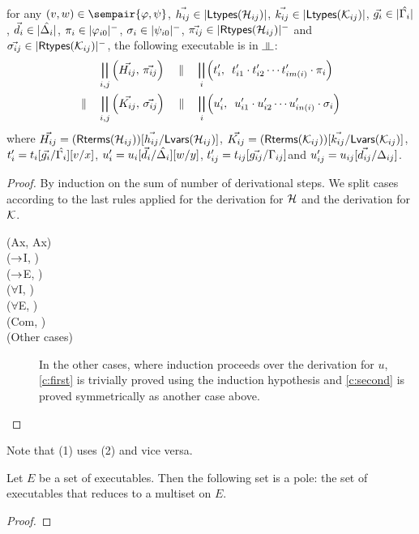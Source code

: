 \begin{proposition}[Adequacy]
\begin{enumerate}[label=(\arabic{*}), ref=\textit{(\arabic{*})}]
	for any $(v,w)\in\sempair{\phi,\psi}$,
	$\vec{h_{ij}}\in|{\mathsf{Ltypes}({\mathcal{H}_{ij}})}|$,
	$\vec{k_{ij}}\in|{\mathsf{Ltypes}({\mathcal{K}_{ij}})}|$,
	$\vec{g_i}\in|{\hat{\Gamma_i}}|$,
	$\vec{d_i}\in|{\hat{\Delta_i}}|$,
	$\pi_i\in|{\varphi_{i0}}|^-$,
	$\sigma_i\in|{\psi_{i0}}|^-$,
	$\vec{\pi_{ij}}\in|{\mathsf{Rtypes}({\mathcal{H}_{ij}})}|^-$ and
	$\vec{\sigma_{ij}}\in|{\mathsf{Rtypes}({\mathcal{K}_{ij}})}|^-$,
	the following executable is in $\bbot$:
	\begin{align*}
	       & 	 \bigparallel_{i,j}\left(\vec{H_{ij}},\,
	\vec{\pi_{ij}}\right)\quad \parallel\quad
	\bigparallel_i\left(t_i',\,\,\,t'_{i1}\cdot t'_{i2}\cdots
	t'_{im(i)}\cdot \pi_i\right)
\\
	 \parallel\quad  &
	 \bigparallel_{i,j}\left(\vec{K_{ij}},\,
	\vec{\sigma_{ij}}\right)\quad \parallel\quad
	\bigparallel_i\left(u_i',\,\,\,u'_{i1}\cdot u'_{i2}\cdots
	u'_{in(i)}\cdot \sigma_i\right)
	\end{align*}
	where
	$\vec{H_{ij}}=(\mathsf{Rterms}({\mathcal{H}_{ij}}))[\vec{h_{ij}}/\mathsf{Lvars}({\mathcal{H}_{ij}})]$,\quad
	$\vec{K_{ij}}=(\mathsf{Rterms}({\mathcal{K}_{ij}}))[\vec{k_{ij}}/\mathsf{Lvars}({\mathcal{K}_{ij}})]$,\quad
	$t'_i=t_i[\vec{g_i}/\hat{\Gamma_i}][v/x]$,\quad
	$u'_i=u_i[\vec{d_i}/\hat{\Delta_i}][w/y]$,\quad
	$t'_{ij}=t_{ij}[\vec{g_{ij}}/\Gamma_{ij}]$\quad and
	$u'_{ij}=u_{ij}[\vec{d_{ij}}/\Delta_{ij}]$\enspace.
 \end{enumerate}
\end{proposition}
\begin{proof}
 By induction on the sum of number of derivational steps.
 We split cases according to the last rules applied for the
 derivation for $\mathcal{H}$ and the derivation for $\mathcal{K}$.
 \begin{description}
  \item[(Ax, Ax)]
  \item[($\rightarrow$I, \textminus)]
  \item[($\rightarrow$E, \textminus)]
  \item[($\forall$I, \textminus)]
  \item[($\forall$E, \textminus)]
  \item[(Com, \textminus)]
  \item[(Other cases)] In the other cases,
       where induction proceeds over the derivation for $u$,
       \ref{c:first} is trivially proved using the induction
       hypothesis and \ref{c:second} is proved
       symmetrically as another case above.
 \end{description}
\end{proof}
Note that (1) uses (2) and vice versa.

\begin{proposition}
 Let $E$ be a set of executables.
 Then the following set is a pole: the set of executables that reduces to
 a multiset on $E$.
\end{proposition}
\begin{proof}
\end{proof}

